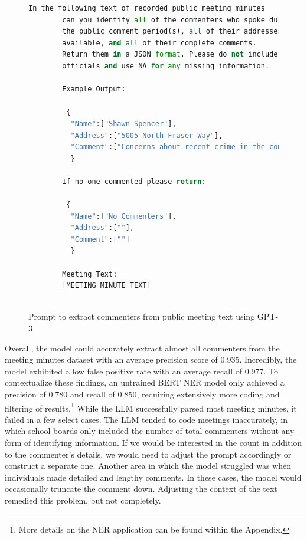     \begin{figure}[H]
        \centering
        \begin{lstlisting}[language=python,  label={fig:meetingtext}]
        In the following text of recorded public meeting minutes
        can you identify all of the commenters who spoke during 
        the public comment period(s), all of their addresses if 
        available, and all of their complete comments. 
        Return them in a JSON format. Please do not include public
        officials and use NA for any missing information.
        
        Example Output: 
        
         {
          "Name":["Shawn Spencer"],
          "Address":["5005 North Fraser Way"],
          "Comment":["Concerns about recent crime in the community"]
          }
        
        If no one commented please return: 
        
         {
          "Name":["No Commenters"],
          "Address":[""],
          "Comment":[""]
          }
        
        Meeting Text:
        [MEETING MINUTE TEXT]
        
        \end{lstlisting}
        \caption[Prompt to Extract Commenters from Public Meeting Text Using GPT-3]{Prompt to extract commenters from public meeting text using GPT-3}
        \label{fig:meetingprompt}
    \end{figure}

    Overall, the model could accurately extract almost all commenters from the meeting minutes dataset with an average precision score of 0.935. Incredibly, the model exhibited a low false positive rate with an average recall of 0.977. To contextualize these findings, an untrained BERT NER model only achieved a precision of 0.780 and recall of 0.850, requiring extensively more coding and filtering of results.\footnote{More details on the NER application can be found within the Appendix.}  While the LLM successfully parsed most meeting minutes, it failed in a few select cases. The LLM tended to code meetings inaccurately, in which school boards only included the number of total commenters without any form of identifying information. If we would be interested in the count in addition to the commenter's details, we would need to adjust the prompt accordingly or construct a separate one. Another area in which the model struggled was when individuals made detailed and lengthy comments. In these cases, the model would occasionally truncate the comment down. Adjusting the context of the text remedied this problem, but not completely.

